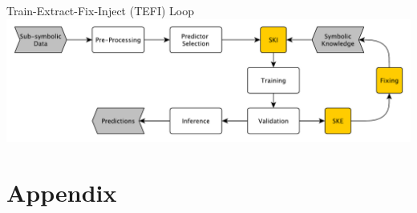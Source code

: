 \documentclass[presentation]{beamer}\mode<presentation>{\usetheme{AMSBolognaFC}}
\begin{document}
\begin{frame}{Train-Extract-Fix-Inject (TEFI) Loop}
    \includegraphics[width=\linewidth]{figures/train-extract-fix-inject.pdf}
\end{frame}

\section*{}

\frame[noframenumbering]{\titlepage}

\section*{\refname}

\begin{frame}{\refname}
    \scriptsize
    
    
\end{frame}

\section*{Appendix}
\end{document}
